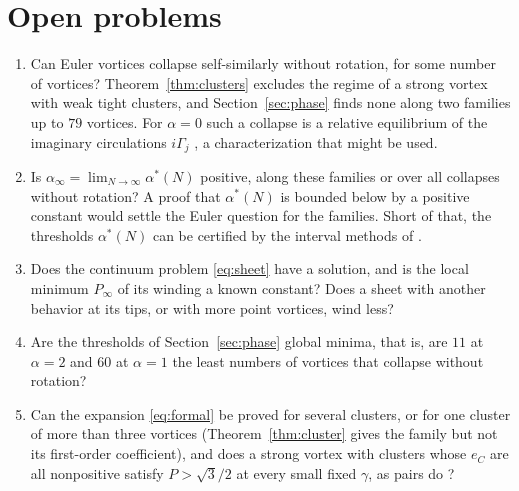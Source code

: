 \documentclass[11pt]{article}
\theoremstyle{definition}
\begin{document}
\section{Open problems}\label{sec:open}

\begin{enumerate}
\item Can Euler vortices collapse self-similarly without rotation, for some number of vortices? Theorem~\ref{thm:clusters} excludes the regime of a strong vortex with weak tight clusters, and Section~\ref{sec:phase} finds none along two families up to $79$ vortices. For $\alpha = 0$ such a collapse is a relative equilibrium of the imaginary circulations $i\Gamma_j$ \cite[Sect.~10]{mw2026}, a characterization that might be used.
\item Is $\alpha_\infty = \lim_{N\to\infty}\alpha^*(N)$ positive, along these families or over all collapses without rotation? A proof that $\alpha^*(N)$ is bounded below by a positive constant would settle the Euler question for the families. Short of that, the thresholds $\alpha^*(N)$ can be certified by the interval methods of \cite{mw2026}.
\item Does the continuum problem \eqref{eq:sheet} have a solution, and is the local minimum $P_\infty$ of its winding a known constant? Does a sheet with another behavior at its tips, or with more point vortices, wind less?
\item Are the thresholds of Section~\ref{sec:phase} global minima, that is, are $11$ at $\alpha = 2$ and $60$ at $\alpha = 1$ the least numbers of vortices that collapse without rotation?
\item Can the expansion \eqref{eq:formal} be proved for several clusters, or for one cluster of more than three vortices (Theorem~\ref{thm:cluster} gives the family but not its first-order coefficient), and does a strong vortex with clusters whose $e_C$ are all nonpositive satisfy $P > \sqrt{3}/2$ at every small fixed $\gamma$, as pairs do \cite[Proposition~4]{mw2026}?
\end{enumerate}
\end{document}
